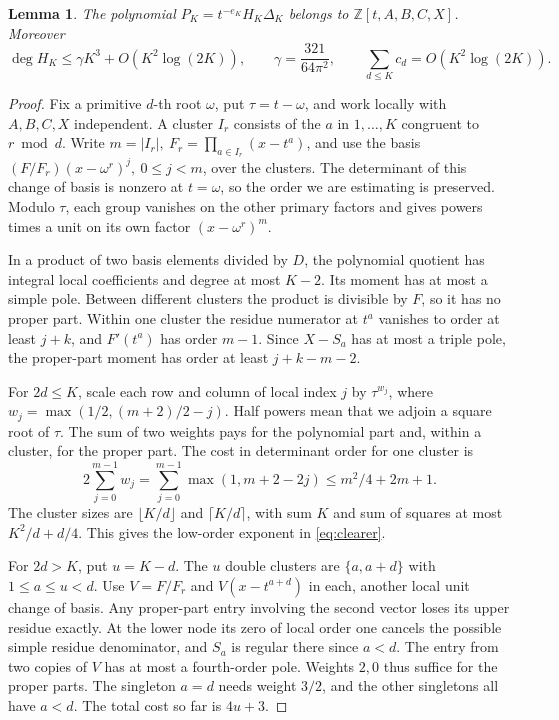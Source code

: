 \documentclass[11pt]{article}
\newtheorem{lemma}[theorem]{Lemma}
\newcommand{\Z}{\mathbb Z}
\begin{document}
\begin{lemma}\label{lem:clear}
The polynomial \(P_K=t^{-e_K}H_K\Delta_K\) belongs to
\(\Z[t,A,B,C,X]\). Moreover
\[
 \deg H_K\le\gamma K^3+O(K^2\log(2K)),\qquad
 \gamma=\frac{321}{64\pi^2},\qquad \sum_{d\le K}c_d=O(K^2\log(2K)).
\]
\end{lemma}
\begin{proof}
Fix a primitive \(d\)-th root \(\omega\), put \(\tau=t-\omega\), and
work locally with \(A,B,C,X\) independent. A cluster \(I_r\) consists
of the \(a\) in \(1,\ldots,K\) congruent to \(r\bmod d\).
Write \(m=|I_r|,\ F_r=\prod_{a\in I_r}(x-t^a)\), and use the basis
\((F/F_r)(x-\omega^r)^j,\ 0\le j<m\), over the clusters.
The determinant of this change of basis is nonzero at \(t=\omega\),
so the order we are estimating is preserved. Modulo \(\tau\), each group vanishes
on the other primary factors and gives powers times a unit on its
own factor \((x-\omega^r)^m\).

In a product of two basis elements divided by \(D\), the polynomial
quotient has integral local coefficients and degree at most \(K-2\).
Its moment has at most a simple pole. Between different clusters
the product is divisible by \(F\), so it has no proper part. Within
one cluster the residue numerator at \(t^a\) vanishes to order at least
\(j+k\), and \(F'(t^a)\) has order \(m-1\). Since \(X-S_a\) has
at most a triple pole, the proper-part moment has order at least
\(j+k-m-2\).

For \(2d\le K\), scale each row and column of local index \(j\) by
\(\tau^{w_j}\), where \(w_j=\max(1/2,(m+2)/2-j)\). Half powers mean
that we adjoin a square root of \(\tau\). The sum of two weights pays
for the polynomial part and, within a cluster, for the proper part.
The cost in determinant order for one cluster is
\[
 2\sum_{j=0}^{m-1}w_j=\sum_{j=0}^{m-1}\max(1,m+2-2j)
                  \le m^2/4+2m+1.
\]
The cluster sizes are \(\lfloor K/d\rfloor\) and \(\lceil K/d\rceil\),
with sum \(K\) and sum of squares at most \(K^2/d+d/4\).
This gives the low-order exponent in \eqref{eq:clearer}.

For \(2d>K\), put \(u=K-d\). The \(u\) double clusters are
\(\{a,a+d\}\) with \(1\le a\le u<d\). Use \(V=F/F_r\) and
\(V(x-t^{a+d})\) in each, another local unit change of basis.
Any proper-part entry involving the second vector loses its upper
residue exactly. At the lower node its zero of local order one
cancels the possible simple residue denominator, and \(S_a\) is
regular there since \(a<d\). The entry from two copies of \(V\)
has at most a fourth-order pole. Weights \(2,0\) thus suffice for
the proper parts.
The singleton \(a=d\) needs weight \(3/2\), and the other singletons
all have \(a<d\). The total cost so far is \(4u+3\).


\end{proof}
\end{document}
